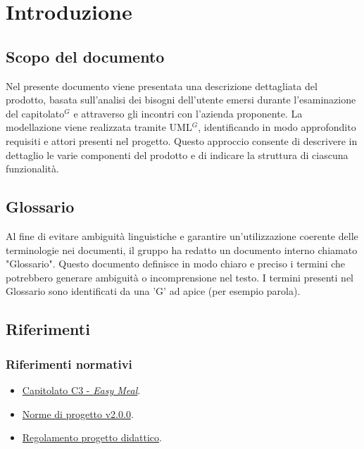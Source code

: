 \section{Introduzione}

\subsection{Scopo del documento}
Nel presente documento viene presentata una descrizione dettagliata del prodotto, basata sull'analisi dei bisogni dell'utente emersi durante l'esaminazione del capitolato$^G$ e attraverso gli incontri con l'azienda proponente. 
La modellazione viene realizzata tramite UML$^G$, identificando in modo approfondito requisiti e attori presenti nel progetto. 
Questo approccio consente di descrivere in dettaglio le varie componenti del prodotto e di indicare la struttura di ciascuna funzionalità.

\subsection{Glossario}
Al fine di evitare ambiguità linguistiche e garantire un'utilizzazione coerente delle terminologie nei documenti, il gruppo ha redatto un documento interno chiamato "Glossario". Questo
documento definisce in modo chiaro e preciso i termini che potrebbero generare ambiguità
o incomprensione nel testo. I termini presenti nel Glossario sono identificati da una 'G' ad
apice (per esempio parola\g).

\subsection{Riferimenti}
\subsubsection{Riferimenti normativi}
\begin{itemize}
    \item \href{https://www.math.unipd.it/~tullio/IS-1/2023/Progetto/C3.pdf}{Capitolato C3 - \textit{Easy Meal}}.
    \item \href{https://project-swenergy.github.io/}{Norme di progetto v2.0.0}.
    \item \href{https://www.math.unipd.it/~tullio/IS-1/2023/Dispense/PD2.pdf}{Regolamento progetto didattico}.
\end{itemize}

